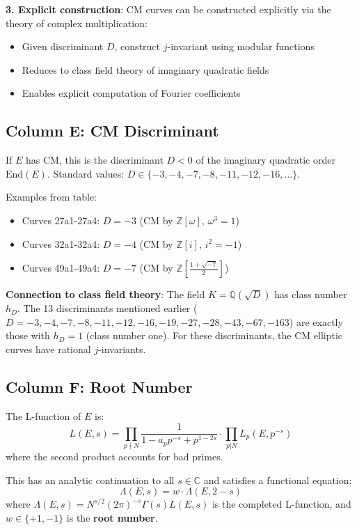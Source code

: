 \documentclass[11pt]{article}
\begin{document}
\textbf{3. Explicit construction}: CM curves can be constructed explicitly via the theory of complex multiplication:
\begin{itemize}
\item Given discriminant $D$, construct $j$-invariant using modular functions
\item Reduces to class field theory of imaginary quadratic fields
\item Enables explicit computation of Fourier coefficients
\end{itemize}

\subsection{Column E: CM Discriminant}

If $E$ has CM, this is the discriminant $D < 0$ of the imaginary quadratic order $\text{End}(E)$. Standard values: $D \in \{-3, -4, -7, -8, -11, -12, -16, \ldots\}$.

Examples from table:
\begin{itemize}
\item Curves 27a1-27a4: $D = -3$ (CM by $\mathbb{Z}[\omega]$, $\omega^3 = 1$)
\item Curves 32a1-32a4: $D = -4$ (CM by $\mathbb{Z}[i]$, $i^2 = -1$)
\item Curves 49a1-49a4: $D = -7$ (CM by $\mathbb{Z}[\frac{1+\sqrt{-7}}{2}]$)
\end{itemize}

\textbf{Connection to class field theory}: The field $K = \mathbb{Q}(\sqrt{D})$ has class number $h_D$. The 13 discriminants mentioned earlier ($D = -3, -4, -7, -8, -11, -12, -16, -19, -27, -28, -43, -67, -163$) are exactly those with $h_D = 1$ (class number one). For these discriminants, the CM elliptic curves have rational $j$-invariants.

\subsection{Column F: Root Number}

The L-function of $E$ is:
$$L(E, s) = \prod_{p \nmid N} \frac{1}{1 - a_p p^{-s} + p^{1-2s}} \cdot \prod_{p | N} L_p(E, p^{-s})$$
where the second product accounts for bad primes.

This has an analytic continuation to all $s \in \mathbb{C}$ and satisfies a functional equation:
$$\Lambda(E, s) = w \cdot \Lambda(E, 2-s)$$
where $\Lambda(E, s) = N^{s/2}(2\pi)^{-s}\Gamma(s) L(E, s)$ is the completed L-function, and $w \in \{+1, -1\}$ is the \textbf{root number}.
\end{document}
